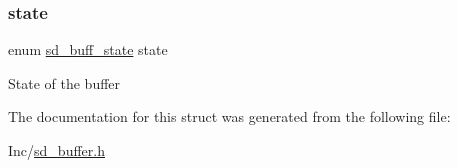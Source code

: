 \subsubsection{\texorpdfstring{state}{state}}
{\footnotesize\ttfamily enum \mbox{\hyperlink{group___s_d___buffer___types_ga52f14e9c7b7d9ba092e1cd615559012b}{sd\+\_\+buff\+\_\+state}} state}

State of the buffer 

The documentation for this struct was generated from the following file\+:\begin{DoxyCompactItemize}
\item 
Inc/\mbox{\hyperlink{sd__buffer_8h}{sd\+\_\+buffer.\+h}}\end{DoxyCompactItemize}
